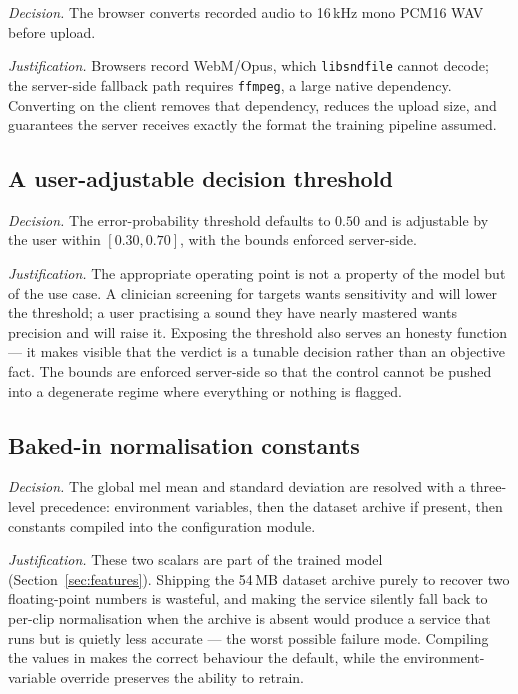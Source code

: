 \emph{Decision.} The browser converts recorded audio to 16\,kHz mono PCM16 WAV
before upload.

\emph{Justification.} Browsers record WebM/Opus, which \texttt{libsndfile}
cannot decode; the server-side fallback path requires \texttt{ffmpeg}, a large
native dependency. Converting on the client removes that dependency, reduces
the upload size, and guarantees the server receives exactly the format the
training pipeline assumed.

\subsection{A user-adjustable decision threshold}
\label{sec:design-threshold}

\emph{Decision.} The error-probability threshold defaults to $0.50$ and is
adjustable by the user within $[0.30, 0.70]$, with the bounds enforced
server-side.

\emph{Justification.} The appropriate operating point is not a property of the
model but of the use case. A clinician screening for targets wants sensitivity
and will lower the threshold; a user practising a sound they have nearly
mastered wants precision and will raise it. Exposing the threshold also serves
an honesty function --- it makes visible that the verdict is a tunable decision
rather than an objective fact. The bounds are enforced server-side so that the
control cannot be pushed into a degenerate regime where everything or nothing
is flagged.

\subsection{Baked-in normalisation constants}

\emph{Decision.} The global mel mean and standard deviation are resolved with a
three-level precedence: environment variables, then the dataset archive if
present, then constants compiled into the configuration module.

\emph{Justification.} These two scalars are part of the trained model
(Section~\ref{sec:features}). Shipping the 54\,MB dataset archive purely to
recover two floating-point numbers is wasteful, and making the service silently
fall back to per-clip normalisation when the archive is absent would produce a
service that runs but is quietly less accurate --- the worst possible failure
mode. Compiling the values in makes the correct behaviour the default, while
the environment-variable override preserves the ability to retrain.

